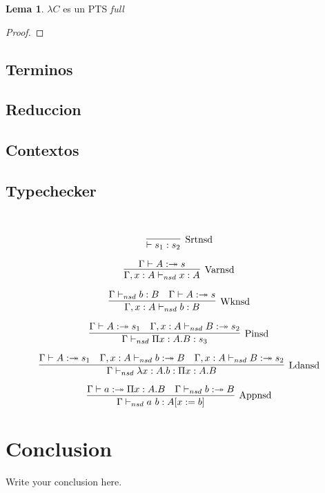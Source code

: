 \documentclass{article}
\theoremstyle{definition}
\newtheorem{lemma}[theorem]{Lema}
\theoremstyle{remark}
\begin{document}
\begin{lemma}
$\lambda C$ es un PTS \it{full}
\end{lemma}
\begin{proof}
\end{proof}


\subsection{Terminos}
\subsection{Reduccion}
\subsection{Contextos}
\subsection{Typechecker}
~\cite{Jutting93checkingalgorithms}
~\cite{Benthem:93}
~\cite{DBLP:conf/types/JuttingMP93}

\begin{equation}
    \label{simple_equation}
\infer[\mathrm{Srtnsd}]
{\vdash s_{1} : s_{2}}{}
\end{equation}

\begin{equation}
    \label{simple_equation}
\infer[\mathrm{Varnsd}]
{\Gamma, x:A \vdash_{nsd} x : A}{\Gamma \vdash A :\twoheadrightarrow s}
\end{equation}

\begin{equation}
    \label{simple_equation}
\infer[\mathrm{Wknsd}]
{\Gamma, x:A \vdash_{nsd} b : B}{\Gamma \vdash_{nsd} b : B & \Gamma \vdash A :\twoheadrightarrow s}
\end{equation}

\begin{equation}
    \label{simple_equation}
\infer[\mathrm{Pinsd}]
{\Gamma \vdash_{nsd} \Pi x:A.B :s_{3}}{\Gamma \vdash A :\twoheadrightarrow s_{1} & \Gamma, x:A \vdash_{nsd} B :\twoheadrightarrow s_{2}}
\end{equation}

\begin{equation}
    \label{simple_equation}
\infer[\mathrm{Ldansd}]
{\Gamma \vdash_{nsd} \lambda x:A.b :\Pi x:A.B}{\Gamma \vdash A :\twoheadrightarrow s_{1} & \Gamma, x:A \vdash_{nsd} b:\twoheadrightarrow B & \Gamma, x:A \vdash_{nsd} B :\twoheadrightarrow s_{2}}
\end{equation}

\begin{equation}
    \label{simple_equation}
\infer[\mathrm{Appnsd}]
{\Gamma \vdash_{nsd} a\ b : A[x:=b]}{\Gamma \vdash a :\twoheadrightarrow \Pi x:A.B & \Gamma \vdash_{nsd} b:\twoheadrightarrow B }
\end{equation}


\section{Conclusion}
Write your conclusion here.


{}

\end{document}
